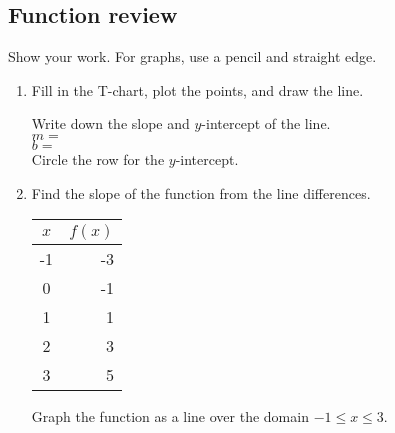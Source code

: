 \documentclass[12pt, oneside]{article}
\begin{document}
\subsection*{Function review}
Show your work. For graphs, use a pencil and straight edge.
  \begin{enumerate}

\subsubsection*{Graphing linear functions}
\item Fill in the T-chart, plot the points, and draw the line.

    \begin{center} %
    \end{center}
Write down the slope and $y$-intercept of the line.\\[0.5cm]
$m=$\\[0.5cm]
$b=$\\[0.5cm]
Circle the row for the $y$-intercept.
\newpage

\item Find the slope of the function from the line differences.
    \begin{center}
      \begin{tabular}{|c|r|}
      \hline
      $x$ & $f(x)$\\
      \hline
      -1 & -3 \\
      \hline
      0 & -1 \\
      \hline
      1 & 1 \\
      \hline
      2 & 3 \\
      \hline
      3 & 5 \\
      \hline
      \end{tabular}
    \end{center}
Graph the function as a line over the domain $-1 \leq x \leq 3$.

\begin{center} %
\end{center}



\end{enumerate}
\end{document}
